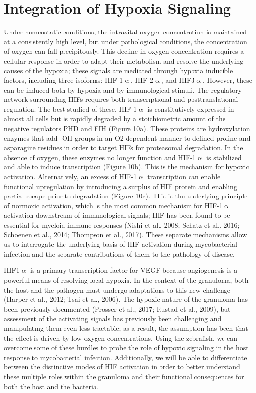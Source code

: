 \section{Integration of Hypoxia Signaling}

Under homeostatic conditions, the intravital oxygen concentration is maintained at a consistently high level, but under pathological conditions, the concentration of oxygen can fall precipitously. This decline in oxygen concentration requires a cellular response in order to adapt their metabolism and resolve the underlying causes of the hypoxia; these signals are mediated through hypoxia inducible factors, including three isoforms: HIF-1$\upalpha$, HIF-2$\upalpha$, and HIF3$\upalpha$. However, these can be induced both by hypoxia and by immunological stimuli. The regulatory network surrounding HIFs requires both transcriptional and posttranslational regulation. The best studied of these, HIF-1$\upalpha$ is constitutively expressed in almost all cells but is rapidly degraded by a stoichiometric amount of the negative regulators PHD and FIH (Figure 10a). These proteins are hydroxylation enzymes that add -OH groups in an O2-dependent manner to defined proline and asparagine residues in order to target HIFs for proteasomal degradation. In the absence of oxygen, these enzymes no longer function and HIF-1$\upalpha$ is stabilized and able to induce transcription (Figure 10b). This is the mechanism for hypoxic activation. Alternatively, an excess of HIF-1$\upalpha$ transcription can enable functional upregulation by introducing a surplus of HIF protein and enabling partial escape prior to degradation (Figure 10c). This is the underlying principle of normoxic activation, which is the most common mechanism for HIF-1$\upalpha$ activation downstream of immunological signals; HIF has been found to be essential for myeloid immune responses (Nishi et al., 2008; Schatz et al., 2016; Schoenen et al., 2014; Thompson et al., 2017). These separate mechanisms allow us to interrogate the underlying basis of HIF activation during mycobacterial infection and the separate contributions of them to the pathology of disease. 

HIF1$\upalpha$ is a primary transcription factor for VEGF because angiogenesis is a powerful means of resolving local hypoxia. In the context of the granuloma, both the host and the pathogen must undergo adaptations to this new challenge (Harper et al., 2012; Tsai et al., 2006). The hypoxic nature of the granuloma has been previously documented (Prosser et al., 2017; Rustad et al., 2009), but assessment of the activating signals has previously been challenging and manipulating them even less tractable; as a result, the assumption has been that the effect is driven by low oxygen concentrations. Using the zebrafish, we can overcome some of these hurdles to probe the role of hypoxic signaling in the host response to mycobacterial infection. Additionally, we will be able to differentiate between the distinctive modes of HIF activation in order to better understand these multiple roles within the granuloma and their functional consequences for both the host and the bacteria. 

